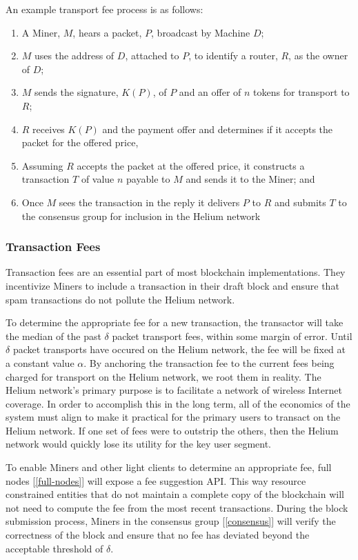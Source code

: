 \documentclass[10pt, nonatbib, nocopyrightspace, reprint]{sigplanconf}
\newcommand{\secref}[1]{[\autoref{#1}]}
\begin{document}
An example transport fee process is as follows:

\begin{enumerate}
  \item A Miner, $M$, hears a packet, $P$, broadcast by Machine $D$;
  \item $M$ uses the address of $D$, attached to $P$, to identify a router, $R$, as the owner of $D$;
  \item $M$ sends the signature, $K(P)$, of $P$ and an offer of $n$ tokens for transport to $R$;
  \item $R$ receives $K(P)$ and the payment offer and determines if it accepts the packet for the offered price,
  \item Assuming $R$ accepts the packet at the offered price, it constructs a transaction $T$ of value $n$ payable to $M$ and sends it to the Miner; and
  \item Once $M$ sees the transaction in the reply it delivers $P$ to $R$ and submits $T$ to the consensus group for inclusion in the Helium network
\end{enumerate}

\subsubsection{Transaction Fees} \label{fees}

Transaction fees are an essential part of most blockchain implementations. They incentivize Miners to include a transaction in their draft block and ensure that spam transactions do not pollute the Helium network.

To determine the appropriate fee for a new transaction, the transactor will take the median of the past $\delta$ packet transport fees, within some margin of error. Until $\delta$ packet transports have occured on the Helium network, the fee will be fixed at a constant value $\alpha$. By anchoring the transaction fee to the current fees being charged for transport on the Helium network, we root them in reality. The Helium network's primary purpose is to facilitate a network of wireless Internet coverage. In order to accomplish this in the long term, all of the economics of the system must align to make it practical for the primary users to transact on the Helium network. If one set of fees were to outstrip the others, then the Helium network would quickly lose its utility for the key user segment.

To enable Miners and other light clients to determine an appropriate fee, full nodes \secref{full-nodes} will expose a fee suggestion API. This way resource constrained entities that do not maintain a complete copy of the blockchain will not need to compute the fee from the most recent transactions. During the block submission process, Miners in the consensus group \secref{consensus} will verify the correctness of the block and ensure that no fee has deviated beyond the acceptable threshold of $\delta$.
\end{document}
